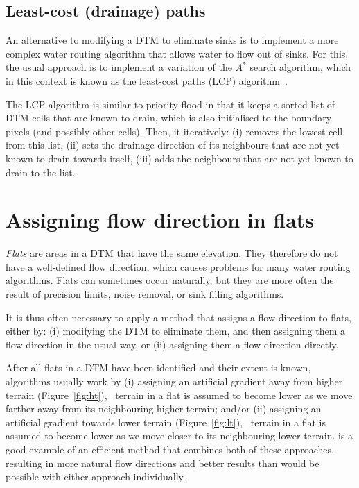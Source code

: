 \subsection{Least-cost (drainage) paths}

An alternative to modifying a DTM to eliminate sinks is to implement a more complex water routing algorithm that allows water to flow out of sinks.
For this, the usual approach is to implement a variation of the \(A^{*}\) search algorithm, which in this context is known as the least-cost paths (LCP) algorithm~\citep{Metz11}.

The LCP algorithm is similar to priority-flood in that it keeps a sorted list of DTM cells that are known to drain, which is also initialised to the boundary pixels (and possibly other cells).
Then, it iteratively: (i) removes the lowest cell from this list, (ii) sets the drainage direction of its neighbours that are not yet known to drain towards itself, (iii) adds the neighbours that are not yet known to drain to the list.

\section[Flow direction in flats]{Assigning flow direction in flats}

\emph{Flats} are areas in a DTM that have the same elevation.
They therefore do not have a well-defined flow direction, which causes problems for many water routing algorithms.
Flats can sometimes occur naturally, but they are more often the result of precision limits, noise removal, or sink filling algorithms.

It is thus often necessary to apply a method that assigns a flow direction to flats, either by: (i) modifying the DTM to eliminate them, and then assigning them a flow direction in the usual way, or (ii) assigning them a flow direction directly.

After all flats in a DTM have been identified and their extent is known, algorithms usually work by (i) assigning an artificial gradient away from higher terrain (Figure~\ref{fig:ht}), \ie\ terrain in a flat is assumed to become lower as we move farther away from its neighbouring higher terrain; and/or (ii) assigning an artificial gradient towards lower terrain (Figure~\ref{fig:lt}), \ie\ terrain in a flat is assumed to become lower as we move closer to its neighbouring lower terrain.
\citet{Barnes14} is a good example of an efficient method that combines both of these approaches, resulting in more natural flow directions and better results than would be possible with either approach individually.

